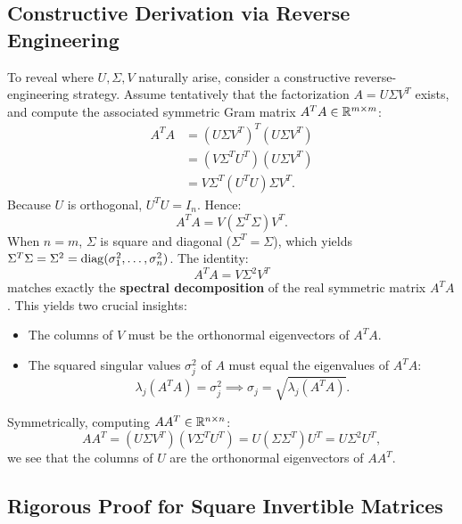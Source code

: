 \subsection{Constructive Derivation via Reverse Engineering}

To reveal where $U, \Sigma, V$ naturally arise, consider a constructive reverse-engineering strategy. Assume tentatively that the factorization $A = U \Sigma V^T$ exists, and compute the associated symmetric Gram matrix $A^T A \in \mathbb{R}^{m \times m}$:
\begin{align}
    A^T A &= (U \Sigma V^T)^T (U \Sigma V^T) \nonumber \\
          &= (V \Sigma^T U^T)(U \Sigma V^T) \nonumber \\
          &= V \Sigma^T (U^T U) \Sigma V^T.
\end{align}
Because $U$ is orthogonal, $U^T U = I_n$. Hence:
\begin{equation}
    A^T A = V (\Sigma^T \Sigma) V^T.
\end{equation}
When $n = m$, $\Sigma$ is square and diagonal ($\Sigma^T = \Sigma$), which yields $\Sigma^T \Sigma = \Sigma^2 = \operatorname{diag}(\sigma_1^2, \dots, \sigma_n^2)$. 
The identity:
\begin{equation}
    A^T A = V \Sigma^2 V^T
\end{equation}
matches exactly the \textbf{spectral decomposition} of the real symmetric matrix $A^T A$. This yields two crucial insights:
\begin{itemize}
    \item The columns of $V$ must be the orthonormal eigenvectors of $A^T A$.
    \item The squared singular values $\sigma_j^2$ of $A$ must equal the eigenvalues of $A^T A$:
    \begin{equation}
        \lambda_j(A^T A) = \sigma_j^2 \implies \sigma_j = \sqrt{\lambda_j(A^T A)}.
    \end{equation}
\end{itemize}

Symmetrically, computing $A A^T \in \mathbb{R}^{n \times n}$:
\begin{equation}
    A A^T = (U \Sigma V^T)(V \Sigma^T U^T) = U (\Sigma \Sigma^T) U^T = U \Sigma^2 U^T,
\end{equation}
we see that the columns of $U$ are the orthonormal eigenvectors of $A A^T$.

\subsection{Rigorous Proof for Square Invertible Matrices}


